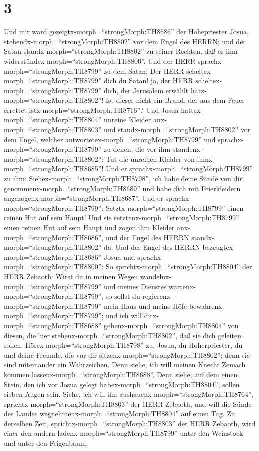 \hypertarget{section-2}{%
\section{3}\label{section-2}}

 Und mir ward gezeigtx-morph=``strongMorph:TH8686'' der
Hohepriester Josua, stehendx-morph=``strongMorph:TH8802'' vor dem Engel
des HERRN; und der Satan standx-morph=``strongMorph:TH8802'' zu seiner
Rechten, daß er ihm widerstündex-morph=``strongMorph:TH8800''.
 Und der HERR sprachx-morph=``strongMorph:TH8799'' zu dem
Satan: Der HERR scheltex-morph=``strongMorph:TH8799'' dich du Satan! ja,
der HERR scheltex-morph=``strongMorph:TH8799'' dich, der Jerusalem
erwählt hatx-morph=``strongMorph:TH8802''! Ist dieser nicht ein Brand,
der aus dem Feuer errettet istx-morph=``strongMorph:TH8716''?
 Und Josua hattex-morph=``strongMorph:TH8804'' unreine
Kleider anx-morph=``strongMorph:TH8803'' und
standx-morph=``strongMorph:TH8802'' vor dem Engel,  welcher
antwortetex-morph=``strongMorph:TH8799'' und
sprachx-morph=``strongMorph:TH8799'' zu denen, die vor ihm
standenx-morph=``strongMorph:TH8802'': Tut die unreinen Kleider von
ihmx-morph=``strongMorph:TH8685''! Und er
sprachx-morph=``strongMorph:TH8799'' zu ihm:
Siehex-morph=``strongMorph:TH8798'', ich habe deine Sünde von dir
genommenx-morph=``strongMorph:TH8689'' und habe dich mit Feierkleidern
angezogenx-morph=``strongMorph:TH8687''.  Und er
sprachx-morph=``strongMorph:TH8799'':
Setztx-morph=``strongMorph:TH8799'' einen reinen Hut auf sein Haupt! Und
sie setztenx-morph=``strongMorph:TH8799'' einen reinen Hut auf sein
Haupt und zogen ihm Kleider anx-morph=``strongMorph:TH8686'', und der
Engel des HERRN standx-morph=``strongMorph:TH8802'' da.  Und
der Engel des HERRN bezeugtex-morph=``strongMorph:TH8686'' Josua und
sprachx-morph=``strongMorph:TH8800'':  So
sprichtx-morph=``strongMorph:TH8804'' der HERR Zebaoth: Wirst du in
meinen Wegen wandelnx-morph=``strongMorph:TH8799'' und meines Dienstes
wartenx-morph=``strongMorph:TH8799'', so sollst du
regierenx-morph=``strongMorph:TH8799'' mein Haus und meine Höfe
bewahrenx-morph=``strongMorph:TH8799''; und ich will
dirx-morph=``strongMorph:TH8688'' gebenx-morph=``strongMorph:TH8804''
von diesen, die hier stehenx-morph=``strongMorph:TH8802'', daß sie dich
geleiten sollen.  Hörex-morph=``strongMorph:TH8798'' zu,
Josua, du Hoherpriester, du und deine Freunde, die vor dir
sitzenx-morph=``strongMorph:TH8802''; denn sie sind miteinander ein
Wahrzeichen. Denn siehe, ich will meinen Knecht Zemach kommen
lassenx-morph=``strongMorph:TH8688''.  Denn siehe, auf dem
einen Stein, den ich vor Josua gelegt
habex-morph=``strongMorph:TH8804'', sollen sieben Augen sein. Siehe, ich
will ihn aushauenx-morph=``strongMorph:TH8764'',
sprichtx-morph=``strongMorph:TH8803'' der HERR Zebaoth, und will die
Sünde des Landes wegnehmenx-morph=``strongMorph:TH8804'' auf einen Tag.
 Zu derselben Zeit, sprichtx-morph=``strongMorph:TH8803''
der HERR Zebaoth, wird einer den andern
ladenx-morph=``strongMorph:TH8799'' unter den Weinstock und unter den
Feigenbaum.

